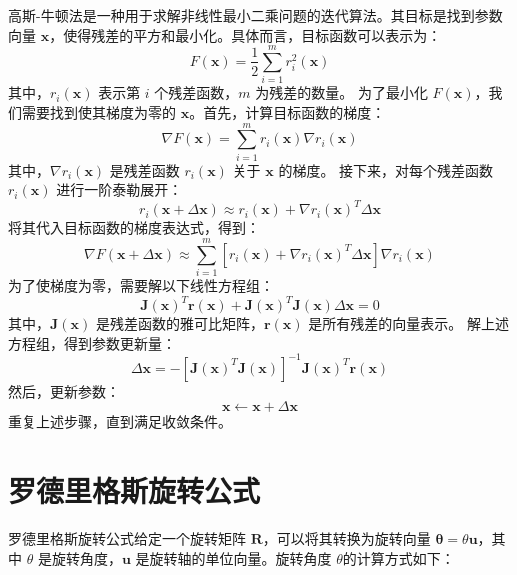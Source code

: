 高斯-牛顿法是一种用于求解非线性最小二乘问题的迭代算法。其目标是找到参数向量 \( \mathbf{x} \)，使得残差的平方和最小化。具体而言，目标函数可以表示为：
\begin{equation}
F(\mathbf{x}) = \frac{1}{2} \sum_{i=1}^{m} r_i^2(\mathbf{x})
\end{equation}
其中，\( r_i(\mathbf{x}) \) 表示第 \( i \) 个残差函数，\( m \) 为残差的数量。
为了最小化 \( F(\mathbf{x}) \)，我们需要找到使其梯度为零的 \( \mathbf{x} \)。首先，计算目标函数的梯度：
\begin{equation}
\nabla F(\mathbf{x}) = \sum_{i=1}^{m} r_i(\mathbf{x}) \nabla r_i(\mathbf{x})
\end{equation}
其中，\( \nabla r_i(\mathbf{x}) \) 是残差函数 \( r_i(\mathbf{x}) \) 关于 \( \mathbf{x} \) 的梯度。
接下来，对每个残差函数 \( r_i(\mathbf{x}) \) 进行一阶泰勒展开：
\begin{equation}
r_i(\mathbf{x} + \Delta \mathbf{x}) \approx r_i(\mathbf{x}) + \nabla r_i(\mathbf{x})^T \Delta \mathbf{x}
\end{equation}
将其代入目标函数的梯度表达式，得到：
\begin{equation}
\nabla F(\mathbf{x} + \Delta \mathbf{x}) \approx \sum_{i=1}^{m} \left[ r_i(\mathbf{x}) + \nabla r_i(\mathbf{x})^T \Delta \mathbf{x} \right] \nabla r_i(\mathbf{x})
\end{equation}
为了使梯度为零，需要解以下线性方程组：
\begin{equation}
\mathbf{J}(\mathbf{x})^T \mathbf{r}(\mathbf{x}) + \mathbf{J}(\mathbf{x})^T \mathbf{J}(\mathbf{x}) \Delta \mathbf{x} = 0
\end{equation}
其中，\( \mathbf{J}(\mathbf{x}) \) 是残差函数的雅可比矩阵，\( \mathbf{r}(\mathbf{x}) \) 是所有残差的向量表示。
解上述方程组，得到参数更新量：
\begin{equation}
\Delta \mathbf{x} = -\left[ \mathbf{J}(\mathbf{x})^T \mathbf{J}(\mathbf{x}) \right]^{-1} \mathbf{J}(\mathbf{x})^T \mathbf{r}(\mathbf{x})
\end{equation}
然后，更新参数：
\begin{equation}
\mathbf{x} \leftarrow \mathbf{x} + \Delta \mathbf{x}
\end{equation}
重复上述步骤，直到满足收敛条件。


\section{罗德里格斯旋转公式}
\label{appendix:rodrigues}
罗德里格斯旋转公式给定一个旋转矩阵 \( \symbf{R} \)，可以将其转换为旋转向量 \( \boldsymbol{\theta} = \theta \symbf{u} \)，其中 \( \theta \) 是旋转角度，\( \symbf{u} \) 是旋转轴的单位向量。旋转角度 \( \theta \)的计算方式如下：

